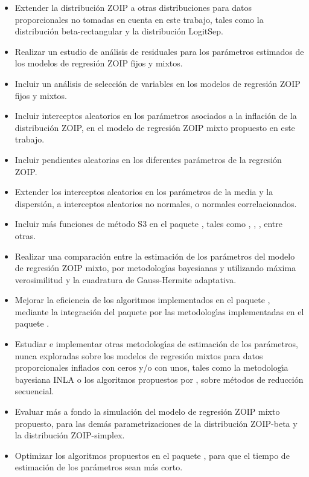 \begin{itemize}
	\item Extender la distribuci\'{o}n ZOIP a otras distribuciones para datos proporcionales no tomadas en cuenta en este trabajo, tales como la distribuci\'{o}n beta-rectangular y la distribuci\'{o}n LogitSep.
	\item Realizar un estudio de an\'{a}lisis de residuales para los par\'{a}metros estimados de los modelos de regresi\'{o}n ZOIP fijos y mixtos.
	\item Incluir un an\'{a}lisis de selecci\'{o}n de variables en los modelos de regresi\'{o}n ZOIP fijos y mixtos.
	\item Incluir interceptos aleatorios en los par\'{a}metros asociados a la inflaci\'{o}n de la distribuci\'{o}n ZOIP, en el modelo de regresi\'{o}n ZOIP mixto propuesto en este trabajo.
\item Incluir pendientes aleatorias en los diferentes par\'{a}metros de la regresi\'{o}n ZOIP.
	\item Extender los interceptos aleatorios en los par\'{a}metros de la media y la dispersi\'{o}n, a interceptos aleatorios no normales, o normales correlacionados.
	\item Incluir m\'{a}s funciones de m\'{e}todo S3 en el paquete , tales como ,  , , entre otras.
	\item Realizar una comparaci\'{o}n entre la estimaci\'{o}n de los par\'{a}metros del modelo de regresi\'{o}n ZOIP mixto, por metodolog\'{\i}as bayesianas y utilizando m\'{a}xima verosimilitud y la cuadratura de Gauss-Hermite adaptativa.
		\item Mejorar la eficiencia de los algoritmos implementados en el paquete , mediante la integraci\'{o}n del paquete  por las metodolog\'{\i}as implementadas en el paquete .
	\item Estudiar e implementar otras metodolog\'{\i}as de estimaci\'{o}n de los par\'{a}metros, nunca exploradas sobre los modelos de regresi\'{o}n mixtos para datos proporcionales inflados con ceros y/o con unos, tales como la metodolog\'{\i}a bayesiana INLA o los algoritmos propuestos por \cite{Ogden1}, sobre m\'{e}todos de reducci\'{o}n secuencial. 
	\item Evaluar m\'{a}s a fondo la simulaci\'{o}n del modelo de regresi\'{o}n ZOIP mixto propuesto, para las dem\'{a}s parametrizaciones de la distribuci\'{o}n ZOIP-beta y la distribuci\'{o}n ZOIP-simplex.
	\item Optimizar los algoritmos propuestos en el paquete , para que el tiempo de estimaci\'{o}n de los par\'{a}metros sean m\'{a}s corto.

\end{itemize}
